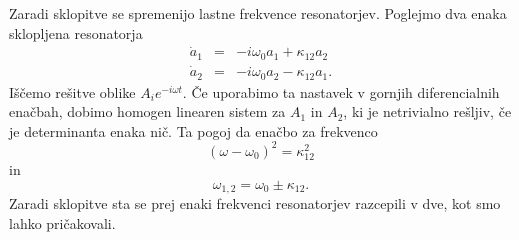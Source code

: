 Zaradi sklopitve se spremenijo lastne frekvence resonatorjev. 
Poglejmo dva enaka sklopljena resonatorja
\begin{eqnarray}
\dot{a}_{1} & = & -i\omega_{0}a_{1}+\kappa_{12}a_{2}\\
\dot{a}_{2} & = & -i\omega_{0}a_{2}-\kappa_{12}a_{1}.
\end{eqnarray}
 Iščemo rešitve oblike $A_{i}e^{-i\omega t}$. Če uporabimo ta nastavek v gornjih
diferencialnih enačbah, dobimo homogen linearen sistem za $A_{1}$ in
$A_{2}$, ki je netrivialno rešljiv, če je determinanta enaka nič.
Ta pogoj da enačbo za frekvenco 
\begin{equation}
(\omega-\omega_{0})^{2}=\kappa_{12}^{2}\label{3.61}
\end{equation}
 in 
\begin{equation}
\omega_{1,2}=\omega_{0}\pm\kappa_{12}.\label{3.62}
\end{equation}
 Zaradi sklopitve sta se prej enaki frekvenci resonatorjev razcepili v dve, kot
smo lahko pričakovali.
